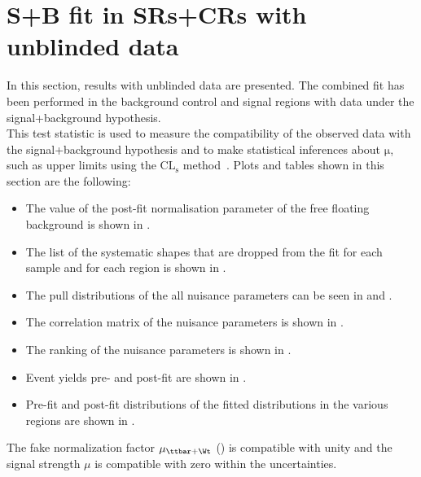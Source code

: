 \section{S+B fit in SRs+CRs with unblinded data}
\label{sec:stat:tzc:splusb:unb}
In this section, results with unblinded data are presented. The combined fit has been performed in the background 
control and signal regions with data under the signal+background hypothesis.\\
This test statistic is used to measure the compatibility of the observed data with the signal+background hypothesis 
and to make statistical inferences about $\mathrm{\mu}$, such as upper limits using the $\mathrm{CL_{s}}$ method~\cite{Junk:1999kv,Read:2002hq}.
Plots and tables shown in this section are the following:
\begin{itemize}
	\item The value of the post-fit normalisation parameter of the free floating background is shown in .
	\item The list of the systematic shapes that are dropped from the fit for each sample and for each region is shown in .
	\item The pull distributions of the all nuisance parameters can be seen in  and .  
	\item The correlation matrix of the nuisance parameters is shown in .
	\item The ranking of the nuisance parameters is shown in . 
	\item Event yields pre- and post-fit are shown in . 
	\item Pre-fit and post-fit distributions of the fitted distributions in the various regions are shown in .
\end{itemize}
The fake normalization factor $\mu_{\ttbar+\Wt}$ () is compatible with unity and the signal strength $\mu$ is compatible with zero within the uncertainties.\\
